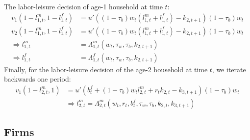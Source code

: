 \documentclass[ProjectUYA]{subfiles}
\begin{document}
 The labor-leisure decision of age-1 household at time $t$:
\begin{subequations}
\label{eq:labor1_t}
	\begin{align}
		v_1(1-l_{1,t}^m,1-l_{1,t}^f)&=u'\left((1-\tau_b)w_t (l_{1,t}^m +l_{1,t}^f) -k_{2,t+1}\right)(1-\tau_b)w_t \label{eq:optimallabormale_t}\\
v_2(1-l_{1,t}^m,1-l_{1,t}^f)&=u'\left((1-\tau_b)w_t (l_{1,t}^m +l_{1,t}^f) -k_{2,t+1}\right)(1-\tau_b)w_t 
\label{eq:optimallaborfemale_t}\\
\Rightarrow  
	l_{1,t}^m&=\Lambda_{1,t}^m(w_t,\tau_w,\tau_b,k_{2,t+1}) \label{eq:laborpolicymale_t}\\
\Rightarrow	
	l_{1,t}^f&=\Lambda_{1,t}^f(w_t,\tau_w,\tau_b,k_{2,t+1}) \label{eq:laborpolicyfemale_t}
	\end{align}
\end{subequations}
Finally, for the labor-leisure decision of the age-2 household at time $t$, we iterate backwards one period:
\begin{subequations}
\label{eq:labor2_t}
	\begin{align}
v_1(1-l_{2,t}^m,1)&=u'\left(b_{t}^f+(1-\tau_b)w_{t} l_{2,t}^m  + r_{t}k_{2,t} -k_{3,t+1}\right)(1-\tau_b)w_{t}		 \label{eq:optimallabormale2_t}\\
&\Rightarrow  
l_{2,t}^m =\Lambda_{2,t}^m(w_{t},r_{t},b_{t}^f, \tau_w,\tau_b,k_{2,t},k_{3,t+1})	\label{eq:laborpolicymale2_t}
	\end{align}
\end{subequations}

\subsection{Firms}
\end{document}
